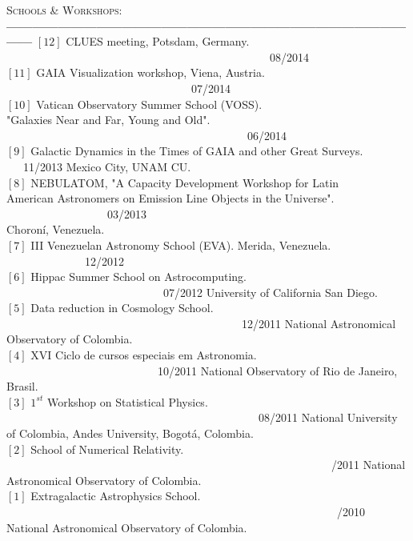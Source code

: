 \documentclass[letterpaper]{article}
\begin{document}
\textsc{\Large Schools \& Workshops:}\\
{\bf---------------------------------------------------------------------------------------------------}
$\left[12\right]$ CLUES meeting, Potsdam, Germany. \indent \ \ \ \ \ \ \ \ \ \ \ \ \ \ \ \ \ \ \ \ \ \ \ \ \ \ \ \ \ \ \ \ \ \ \ \ \ \ \ \ \ \ \ \ \ \ \ 08/2014\\
$\left[11\right]$ GAIA Visualization workshop, Viena, Austria. \indent \ \ \  \ \ \ \ \ \ \ \ \ \ \ \ \ \ \ \ \ \ \ \ \ \ \ \ \ \ \ \ \ \ 07/2014\\
$\left[10\right]$ Vatican Observatory Summer School (VOSS).\\
"Galaxies Near and Far, Young and Old". \indent \ \ \ \  \ \ \  \ \ \  \ \ \  \ \  
 \ \ \ \ \ \ \ \ \ \ \ \ \ \ \ \ \ \ \ \ \ \ \ \ \ \ \ \ 06/2014 \\
$\left[9\right]$ Galactic Dynamics in the Times of GAIA and other Great Surveys. \indent \ \ \ 11/2013
Mexico City, UNAM CU.\\
$\left[8\right]$ \textsc{NEBULATOM}, "A Capacity Development Workshop for Latin\\ 
American Astronomers on Emission Line Objects in the Universe". \indent \ \ \ \ \ \ \ \ \ \ \ \ \ \ \ \ \ \ 03/2013 \\
Choron\'i, Venezuela.  \\
$\left[7\right]$ III Venezuelan Astronomy School (EVA). Merida, Venezuela. \indent \ \ \ \ \ \ \ \ \ \ \ \ \ \ 12/2012\\
$\left[6\right]$ Hippac Summer School on Astrocomputing. \indent \ \ \ \ \ \ \ \ \ \ \ \ \ \ \ \ \ \ \ \ \ \ \ \ \ \ \ \ 07/2012 
University of California San Diego. \\
$\left[5\right]$ Data reduction in Cosmology School.  \indent \ \ \ \ \ \ \ \ \ \ \ \ \ \ \ \ \ \ \ \ \ \ \ \ \ \ \ \ \ \ \ \ \ \ \ \ \ \ \ \ \ \ 12/2011 
National Astronomical Observatory of Colombia.\\
$\left[4\right]$ XVI Ciclo de cursos especiais em Astronomia.  \indent \ \ \ \ \ \ \ \ \ \ \ \ \ \ \ \ \ \ \ \ \ \ \ \ \ \ \ 10/2011
National Observatory of Rio de Janeiro, Brasil. \\
$\left[3\right]$ $1^{st}$ Workshop on Statistical Physics. \indent \ \ \ \ \ \ \ \ \ \ \ \ \ \ \ \ \ \ \ \ \ \ \ \ \ \ \ \ \ \ \ \ \ \ \ \ \ \ \ \ \ \ \ \ \ 08/2011
National University of Colombia, Andes University, Bogot\'{a}, Colombia. \\
$\left[2\right]$ School of Numerical Relativity. \indent \ \ \ \ \ \ \ \ \ \ \ \ \ \ \ \ \ \ \ \ \ \ \ \ \ \ \ \ \ \ \ \ \ \ \ \ \ \ \ \ \ \ \ \ \ \ \ \ \ \ \ \ \ \ \ \ \ \ /2011
National Astronomical Observatory of Colombia.\\
$\left[1\right]$ Extragalactic Astrophysics School. \indent \ \ \ \ \ \ \ \ \ \ \ \ \ \ \ \ \ \ \ \ \ \ \ \ \ \ \ \ \ \ \ \ \ \ \ \ \ \ \ \ \ \ \ \ \ \ \ \ \ \ \ \ \ \ \ \ \ \ \ /2010
National Astronomical Observatory of Colombia.\\
\end{document}
